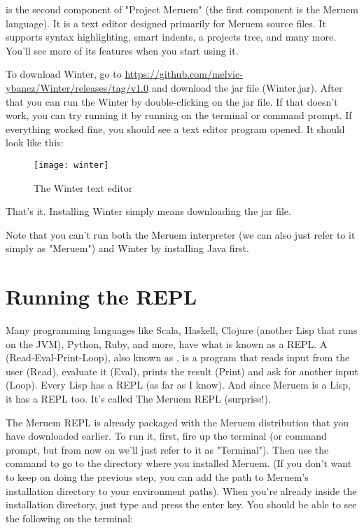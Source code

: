  is the second component of "Project Meruem" (the first component is the Meruem language). It is a text editor designed primarily for Meruem source files. It supports syntax highlighting, smart indents, a projects tree, and many more. You'll see more of its features when you start using it.

To download Winter, go to \url{https://github.com/melvic-ybanez/Winter/releases/tag/v1.0} and download the jar file (Winter.jar). After that you can run the Winter by double-clicking on the jar file. If that doesn't work, you can try running it by running  on the terminal or command prompt. If everything worked fine, you should see a text editor program opened. It should look like this:

\begin{figure}[H]
\texttt{[image: winter]}
\caption{The Winter text editor}
\centering
\end{figure}

That's it. Installing Winter simply means downloading the jar file.

Note that you can't run both the Meruem interpreter (we can also just refer to it simply as "Meruem") and Winter by installing Java first.

\section{Running the REPL}
Many programming languages like Scala, Haskell, Clojure (another Lisp that runs on the JVM), Python, Ruby, and more, have what is known as a REPL. A  (Read-Eval-Print-Loop), also known as , is a program that reads input from the user (Read), evaluate it (Eval), prints the result (Print) and ask for another input (Loop). Every Lisp has a REPL (as far as I know). And since Meruem is a Lisp, it has a REPL too. It's called The Meruem REPL (surprise!). 

The Meruem REPL is already packaged with the Meruem distribution that you have downloaded earlier. To run it, first, fire up the terminal (or command prompt, but from now on we'll just refer to it as "Terminal"). Then use the  command to go to the directory where you installed Meruem. (If you don't want to keep on doing the previous step, you can add the path to Meruem's installation directory to your environment paths). When you're already inside the installation directory, just type  and press the enter key. You should be able to see the following on the terminal:

